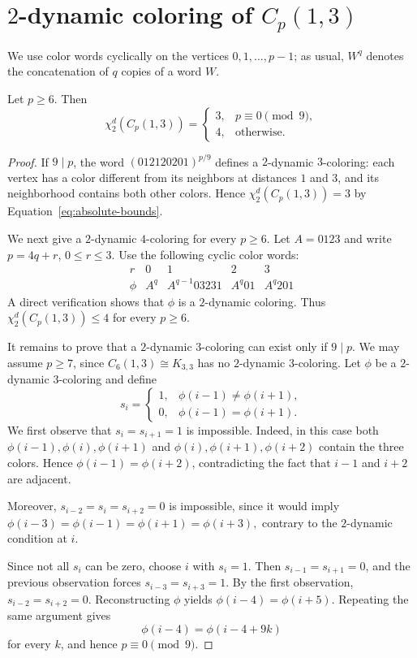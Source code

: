 \section{$2$-dynamic coloring of $C_p(1,3)$}

We use color words cyclically on the vertices
$0,1,\ldots,p-1$; as usual, $W^q$ denotes the concatenation of
$q$ copies of a word $W$.

\begin{theorem}\label{thm:circulant-r2}
Let $p\ge6$. Then
\[
\chi_2^d(C_p(1,3))=
\begin{cases}
3, & p\equiv0\pmod9,\\
4, & \text{otherwise}.
\end{cases}
\]
\end{theorem}

\begin{proof}
If $9\mid p$, the word
$
(012120201)^{p/9}
$
defines a $2$-dynamic $3$-coloring: each vertex has a color different
from its neighbors at distances $1$ and $3$, and its neighborhood
contains both other colors. Hence
$\chi_2^d(C_p(1,3))=3$ by
Equation~\ref{eq:absolute-bounds}.

We next give a $2$-dynamic $4$-coloring for every $p\ge6$.
Let $A=0123$ and write $p=4q+r$, $0\le r\le3$. Use the following
cyclic color words:
\[
\begin{array}{c|cccc}
r&0&1&2&3\\ \hline
\phi&A^q&A^{q-1}03231&A^q01&A^q201
\end{array}
\]
A direct verification shows that $\phi$ is a $2$-dynamic coloring.
Thus $\chi_2^d(C_p(1,3))\le4$ for every $p\ge6$.

It remains to prove that a $2$-dynamic $3$-coloring can exist only if
$9\mid p$. We may assume $p\ge7$, since
$C_6(1,3)\cong K_{3,3}$ has no $2$-dynamic $3$-coloring.
Let $\phi$ be a $2$-dynamic $3$-coloring and define
\[
s_i=
\begin{cases}
1,&\phi(i-1)\neq\phi(i+1),\\
0,&\phi(i-1)=\phi(i+1).
\end{cases}
\]
We first observe that $s_i=s_{i+1}=1$ is impossible. Indeed, in this
case both
$
\phi(i-1),\phi(i),\phi(i+1)
$
and
$
\phi(i),\phi(i+1),\phi(i+2)
$
contain the three colors. Hence $\phi(i-1)=\phi(i+2)$, contradicting
the fact that $i-1$ and $i+2$ are adjacent.

Moreover,
$
s_{i-2}=s_i=s_{i+2}=0
$
is impossible, since it would imply
$
\phi(i-3)=\phi(i-1)=\phi(i+1)=\phi(i+3),
$
contrary to the $2$-dynamic condition at $i$.

Since not all $s_i$ can be zero, choose $i$ with $s_i=1$.
Then $s_{i-1}=s_{i+1}=0$, and the previous observation forces
$s_{i-3}=s_{i+3}=1$. By the first observation,
$s_{i-2}=s_{i+2}=0$.
Reconstructing $\phi$ yields $\phi(i-4)=\phi(i+5)$.
Repeating the same argument gives
\[
\phi(i-4)=\phi(i-4+9k)
\]
for every $k$, and hence $p\equiv0\pmod9$.
\end{proof}
